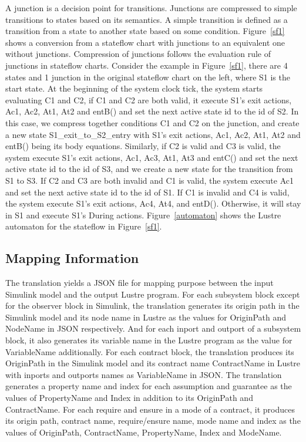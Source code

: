 \documentclass{article}
\begin{document}
A junction is a decision point for transitions. 
Junctions are compressed to simple transitions to states based on its semantics. 
A simple transition is defined as a transition from a state to another state based on some condition. 
Figure~\ref{sf1} shows a conversion from a stateflow chart with junctions to an equivalent one without junctions.
Compression of junctions follows the evaluation rule of junctions in stateflow charts.
Consider the example in Figure~\ref{sf1}, there are 4 states and 1 junction in the original stateflow chart on the left, where S1 is the start state.
At the beginning of the system clock tick, the system starts evaluating C1 and C2, if C1 and C2 are both valid, it execute S1's exit actions, Ac1, Ac2, At1, At2 and entB() and set the next active state id to the id of S2. 
In this case, we compress together conditions C1 and C2 on the junction, and create a new state \textsf{S1\_exit\_to\_S2\_entry} with S1's exit actions, Ac1, Ac2, At1, At2 and entB() being its body equations. 
Similarly, if C2 is valid and C3 is valid, the system execute S1's exit actions, Ac1, Ac3, At1, At3 and entC() and set the next active state id to the id of S3, and we create a new state for the transition from S1 to S3.
If C2 and C3 are both invalid and C1 is valid, the system execute Ac1 and set the next active state id to the id of S1.
If C1 is invalid and C4 is valid, the system execute S1's exit actions, Ac4, At4, and entD().  
Otherwise, it will stay in S1 and execute S1's During actions. 
Figure~\ref{automaton} shows the Lustre automaton for the stateflow in Figure~\ref{sf1}.


\subsection{Mapping Information}

The translation yields a JSON file for mapping purpose between the input Simulink model and the output Lustre program. 
For each subsystem block except for the observer block in Simulink, the translation generates its origin path in the Simulink model and its node name in Lustre as the values for \textsf{OriginPath} and \textsf{NodeName} in JSON respectively.
And for each inport and outport of a subsystem block, it also generates its variable name in the Lustre program as the value for \textsf{VariableName} additionally.
For each contract block, the translation produces its \textsf{OriginPath} in the Simulink model and its contract name \textsf{ContractName} in Lustre with inports and outports names as \textsf{VariableName} in JSON.
The translation generates a property name and index for each assumption and guarantee as the values of \textsf{PropertyName} and \textsf{Index} in addition to its \textsf{OriginPath} and \textsf{ContractName}.
For each require and ensure in a mode of a contract, it produces its origin path, contract name, require/ensure name, mode name and index as the values of 
\textsf{OriginPath}, \textsf{ContractName}, \textsf{PropertyName}, \textsf{Index} and \textsf{ModeName}.
\end{document}
